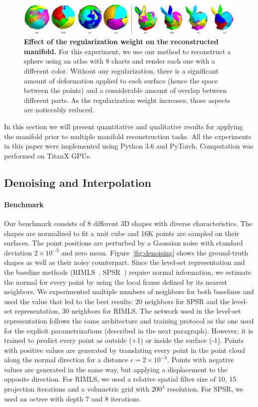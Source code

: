 \begin{figure}[t]
\centering
\includegraphics[width=\linewidth]{dmp/imgs/regularization.pdf}
	\caption{\label{fig:reg} \small
	\textbf{Effect of the regularization weight on the reconstructed manifold.} 
	For this experiment, we use our method to reconstruct a sphere using an atlas with 8 charts and render each one with a different color.
	Without any regularization, there is a significant amount of deformation applied to each surface (hence the space between the points) and a considerable amount of overlap between different parts. As the regularization weight increases, those aspects are
	noticeably reduced. 
	\small}
	\vspace{-12pt}
\end{figure}

In this section we will present quantitative and qualitative results for
applying the manifold prior to multiple manifold reconstruction tasks.
All the experiments in this paper were implemented using Python 3.6 and PyTorch.
Computation was performed on TitanX GPUs. 

\subsection{Denoising and Interpolation}

\paragraph*{Benchmark} Our benchmark consists of 8 different 3D shapes with diverse characteristics.
The shapes are normalized to fit a unit cube and 16K points are sampled on their surfaces.
The point positions are perturbed by a Gaussian noise with standard deviation $2\times10^{-3}$ and zero mean.
Figure~\ref{fig:denoising} shows the ground-truth shapes as well
as their noisy counterpart.
Since the level-set representation and the baseline methods 
(RIMLS~\cite{rimls},  SPSR~\cite{spsr}) 
require normal information, we estimate the normal for every point by using the local frame defined by its nearest neighbors.
We experimented multiple numbers of neighbors for both baselines and used the value that led to the best results: 20 neighbors for SPSR and the level-set representation, 30 neighbors for RIMLS.
The network used in the level-set representation follows the same architecture
and training protocol
as the one used for the explicit parametrizations (described in the next paragraph).
However, it is trained to predict every point as outside (+1) or inside the surface (-1).
Points with positive values are generated by translating every point in the point cloud along the normal direction for a distance $\epsilon=2\times10^{-3}$.
Points with negative values are generated in the same way, but applying a displacement
to the opposite direction.
For RIMLS, we used a relative spatial filter size of 10, 15 projection iterations and a volumetric grid with $200^3$ resolution.
For SPSR, we used an octree with depth 7 and 8 iterations.

